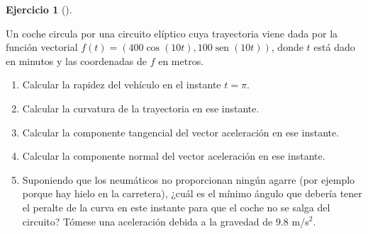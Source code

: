 \documentclass[
  a4paper,
]{scrreport}
\theoremstyle{definition}
\newtheorem{exercise}{Ejercicio}[chapter]
\theoremstyle{remark}
\begin{document}
\begin{exercise}[]\protect\hypertarget{exr-2}{}\label{exr-2}

Un coche circula por una circuito elíptico cuya trayectoria viene dada
por la función vectorial
\(f(t)=(400\cos(10t), 100\operatorname{sen}(10t))\), donde \(t\) está
dado en minutos y las coordenadas de \(f\) en metros.

\begin{enumerate}
\def\labelenumi{\alph{enumi}.}
\item
  Calcular la rapidez del vehículo en el instante \(t=\pi\).
\item
  Calcular la curvatura de la trayectoria en ese instante.
\item
  Calcular la componente tangencial del vector aceleración en ese
  instante.
\item
  Calcular la componente normal del vector aceleración en ese instante.
\item
  Suponiendo que los neumáticos no proporcionan ningún agarre (por
  ejemplo porque hay hielo en la carretera), ¿cuál es el mínimo ángulo
  que debería tener el peralte de la curva en este instante para que el
  coche no se salga del circuito? Tómese una aceleración debida a la
  gravedad de \(9.8\) m/s\(^2\).
\end{enumerate}

\end{exercise}
\end{document}
